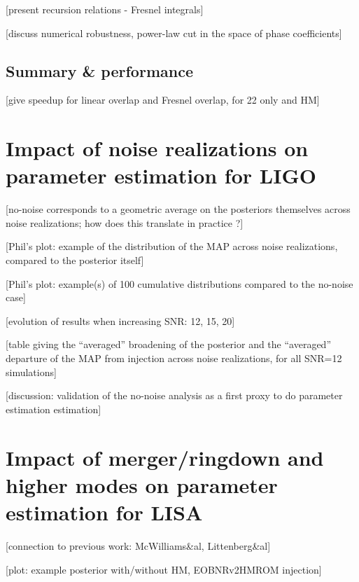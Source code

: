 \documentclass[aps,showpacs,%
prd,superscriptaddress,nofootinbib]{revtex4}
\begin{document}
[present recursion relations - Fresnel integrals]

[discuss numerical robustness, power-law cut in the space of phase coefficients]


\subsection{Summary \& performance}
\label{subsec:performance}

[give speedup for linear overlap and Fresnel overlap, for 22 only and HM]


\section{Impact of noise realizations on parameter estimation for LIGO}
\label{sec:noiseligo}

[no-noise corresponds to a geometric average on the posteriors themselves across noise realizations; how does this translate in practice ?]

[Phil's plot: example of the distribution of the MAP across noise realizations, compared to the posterior itself]

[Phil's plot: example(s) of 100 cumulative distributions compared to the no-noise case]

[evolution of results when increasing SNR: 12, 15, 20]

[table giving the ``averaged'' broadening of the posterior and the ``averaged'' departure of the MAP from injection across noise realizations, for all SNR=12 simulations]

[discussion: validation of the no-noise analysis as a first proxy to do parameter estimation estimation]


\section{Impact of merger/ringdown and higher modes on parameter estimation for LISA}
\label{sec:pelisa}

[connection to previous work: McWilliams\&al, Littenberg\&al]

[plot: example posterior with/without HM, EOBNRv2HMROM injection]
\end{document}
